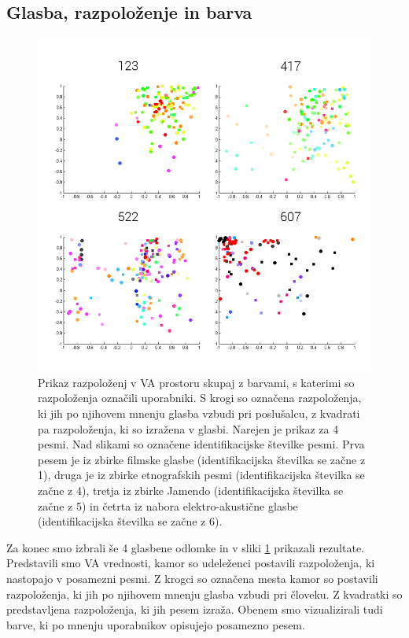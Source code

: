 \documentclass[a4paper, 12pt]{book}
\begin{document}
{\subsection{Glasba, razpoloženje in barva}

\begin{figure}[hbt]
\centering
\includegraphics[width=12.5cm]{images/moodmusic.png}

\caption{Prikaz razpoloženj v VA prostoru skupaj z barvami, s katerimi so razpoloženja označili uporabniki. S krogi so označena razpoloženja, ki jih po njihovem mnenju glasba vzbudi pri poslušalcu, z kvadrati pa razpoloženja, ki so izražena v glasbi. Narejen je prikaz za 4 pesmi. Nad slikami so označene identifikacijske številke pesmi. Prva pesem je iz zbirke filmske glasbe (identifikacijska številka se začne z 1), druga je iz zbirke etnografskih pesmi (identifikacijska številka se začne z 4), tretja iz zbirke Jamendo (identifikacijska številka se začne z 5) in četrta iz nabora elektro-akustične glasbe (identifikacijska številka se začne z 6).}
\label{moodmusic}
\end{figure} 

Za konec smo izbrali še 4 glasbene odlomke in v sliki \ref{moodmusic} prikazali rezultate. Predstavili smo VA vrednosti, kamor so udeleženci postavili razpoloženja, ki nastopajo v posamezni pesmi. Z krogci so označena mesta kamor so postavili razpoloženja, ki jih po njihovem mnenju glasba vzbudi pri človeku. Z kvadratki so predstavljena razpoloženja, ki jih pesem izraža. Obenem smo vizualizirali tudi barve, ki po mnenju uporabnikov opisujejo posamezno pesem. 

}
\end{document}
